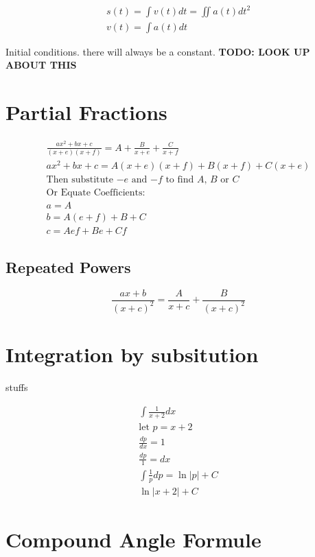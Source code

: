 \documentclass{article}
\begin{document}
\begin{gather}
	s(t) = \int v(t) dt = \iint a(t) dt^2 \\
	v(t) = \int a(t) dt
\end{gather}

Initial conditions. there will always be a constant. \textbf{TODO: LOOK UP ABOUT THIS}

\section{Partial Fractions}

\begin{gather}
	\frac{ax^2+bx+c}{(x+e)(x+f)} = A + \frac{B}{x+e} + \frac{C}{x+f}\\
	ax^2+bx+c = A(x+e)(x+f) + B(x+f) + C(x+e)\\
	\text{Then substitute $-e$ and $-f$ to find $A$, $B$ or $C$} \\
	\text{Or Equate Coefficients:} \\
	a = A \\
	b = A(e + f) + B + C \\
	c = Aef + Be + Cf 
\end{gather}

\subsection{Repeated Powers}

\begin{equation}
	\frac{ax + b}{(x + c)^2} = \frac{A}{x+c} + \frac{B}{(x+c)^2}
\end{equation}


\section{Integration by subsitution}
stuffs

\begin{gather}
	\int \frac{1}{x+2} dx \\
	\text{let } p = x + 2 \\
	\frac{dp}{dx} = 1 \\
	\frac{dp}{1} = dx \\
	\int \frac{1}{p}dp = \ln{\left |p \right | + C} \\
	\ln \left |x + 2 \right | + C
\end{gather}

\section{Compound Angle Formule}
\end{document}

